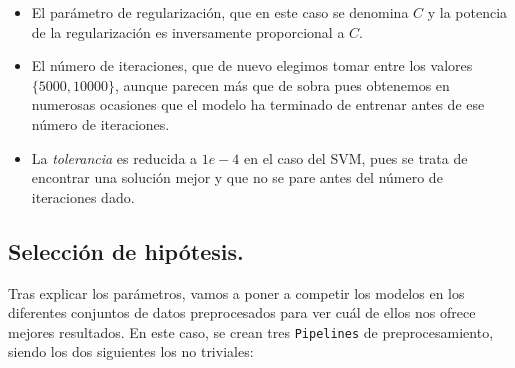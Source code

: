 \documentclass[a4paper, 20pt]{article}
\begin{document}
\begin{itemize}

\item El parámetro de regularización, que en este caso se denomina $C$ y la potencia de la regularización es inversamente proporcional a $C$.

\item El número de iteraciones, que de nuevo elegimos tomar entre los valores $\{5000,10000\}$, aunque parecen más que de sobra pues obtenemos en numerosas ocasiones que el modelo ha terminado de entrenar antes de ese número de iteraciones.
  \item La \emph{tolerancia} es reducida a $1e-4$ en el caso del SVM, pues se trata de encontrar una solución mejor y que no se pare antes del número de iteraciones dado.

\end{itemize}




\subsection{Selección de hipótesis.}

Tras explicar los parámetros, vamos a poner a competir los modelos en los diferentes conjuntos de datos preprocesados para ver cuál de ellos nos ofrece mejores resultados. En este caso, se crean tres \lstinline{Pipelines} de preprocesamiento, siendo los dos siguientes los no triviales:



\begin{minipage}{\textwidth}
  \begin{parcolumns}{2}


    \colplacechunks
  \end{parcolumns}
\end{minipage}
\end{document}
